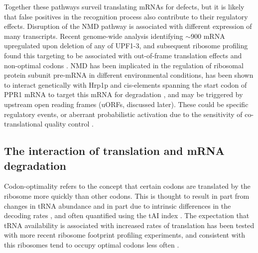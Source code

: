 
Together
these pathways surveil translating mRNAs for defects, but it is likely
that false positives in the recognition process also contribute to
their regulatory effects.  
Disruption of the NMD pathway is associated
with different expression of many transcripts. Recent genome-wide
analysis identifying $\sim$900 mRNA upregulated upon deletion of any of
UPF1-3, and subsequent ribosome profiling found this targeting to be
associated with out-of-frame translation effects and non-optimal
codons \parencite{celik2017high}.
NMD has been implicated in the regulation
of ribosomal protein subunit pre-mRNA 
\parencite{garre2013nonsense}
in different
environmental conditions, has been shown to interact genetically with
Hrp1p and cis-elements spanning the start codon of PPR1 mRNA to target
this mRNA for degradation 
\parencite{pierrat19935,kebaara2003upf},
and may be triggered by upstream open reading frames (uORFs, discussed
later). These could be specific regulatory events, 
or aberrant probabilistic
activation due to the sensitivity of co-translational quality control
\parencite{celik2017high}.


\subsection{The interaction of translation and mRNA
degradation}

Codon-optimality refers to the concept that certain codons
are translated by the ribosome more quickly than other codons. This is
thought to result in part from changes in tRNA abundance and in part
due to intrinsic differences in the decoding rates 
\parencite{curran1989rates,thomas1988codon}, and often quantified using the tAI index
\parencite{reis2004solving}. The expectation that tRNA availability is
associated with increased rates of translation has been tested with
more recent ribosome footprint profiling experiments, and consistent
with this ribosomes tend to occupy optimal codons less often 
\parencite{weinberg2016improved}.  

